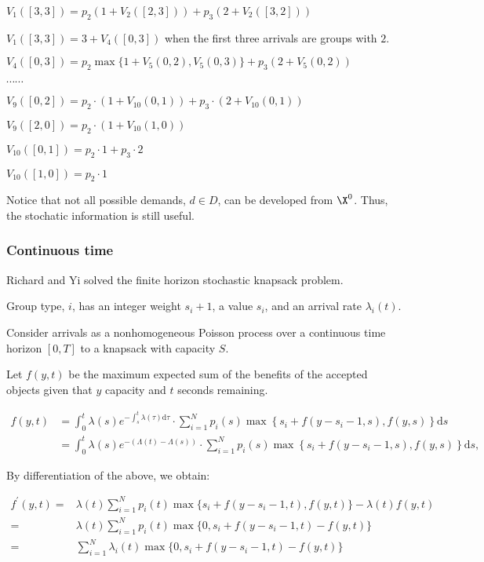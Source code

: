 $V_{1}([3,3]) = p_{2} (1+ V_{2}([2,3])) + p_{3} (2 + V_{2}([3,2]))$

$V_{1}([3,3]) = 3 + V_{4}([0,3])$ when the first three arrivals are groups with $2$.

$V_{4}([0,3]) = p_{2} \max\{1 + V_{5}(0,2), V_{5}(0,3)\} + p_{3} (2+ V_{5}(0,2))$

$\cdots \cdots$

$V_{9}([0,2]) = p_{2} \cdot (1 + V_{10}(0,1)) + p_{3} \cdot (2+ V_{10}(0,1))$

$V_{9}([2,0]) = p_{2} \cdot (1 + V_{10}(1,0))$

$V_{10}([0,1]) = p_{2} \cdot 1 + p_{3} \cdot 2$

$V_{10}([1,0]) = p_{2} \cdot 1$

Notice that not all possible demands, $d \in D$, can be developed from $\X^{0}$. Thus, the stochatic information is still useful.

\subsubsection*{Continuous time}
Richard and Yi solved the finite horizon stochastic knapsack problem. \cite{van2000finite}

Group type, $i$, has an integer weight $s_i +1$, a value $s_i$, and an arrival rate $\lambda_{i}(t)$.

Consider arrivals as a nonhomogeneous Poisson process over a continuous time horizon $[0, T]$ to a knapsack with capacity $S$.

Let $f(y, t)$ be the maximum expected sum of the benefits of the accepted objects given that $y$ capacity and $t$ seconds remaining.

$$
\begin{aligned}
f(y, t) &= \int_0^t \lambda(s) e^{-\int_s^t \lambda(\tau) \mathrm{d} \tau} \cdot \sum_{i=1}^N p_i(s) \max \left\{s_i+f\left(y-s_i -1, s\right), f(y, s)\right\} \mathrm{d} s \\
 &= \int_0^t \lambda(s) e^{-(\Lambda(t)-\Lambda(s))} \cdot \sum_{i=1}^N p_i(s) \max \left\{s_i+f\left(y-s_i-1, s\right), f(y, s)\right\} \mathrm{d} s,
\end{aligned}
$$

By differentiation of the above, we obtain:

$$
\begin{aligned}
f^{\prime}(y, t)= & \lambda(t) \sum_{i=1}^N p_i(t) \max \{s_i+f\left(y-s_i-1, t\right),f(y, t)\}-\lambda(t) f(y, t) \\
= & \lambda(t) \sum_{i=1}^N p_i(t) \max \{0, s_i+f\left(y-s_i-1, t\right) -f(y, t)\} \\
= & \sum_{i=1}^{N} \lambda_{i}(t) \max \{0, s_i+f\left(y-s_i -1, t\right) -f(y, t)\}
\end{aligned}
$$

